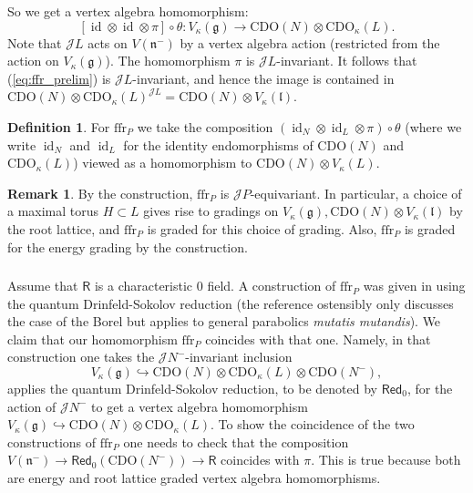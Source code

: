 \documentclass{amsart}
\theoremstyle{definition}
\newtheorem{defi}[Thm]{Definition}
\newtheorem{Rem}[Thm]{Remark}
\newcommand{\sss}{\subsubsection{}}
\newcommand{\Ring}{\mathsf{R}}
\newcommand{\g}{\mathfrak{g}}
\newcommand{\ffr}{\mathrm{ffr}}
\newcommand{\lf}{\mathfrak{l}}
\newcommand{\Jet}{\mathscr{J}}
\newcommand{\CDO}{\mathrm{CDO}}
\numberwithin{equation}{section}
\begin{document}
So we get a vertex algebra homomorphism:
\begin{equation}\label{eq:ffr_prelim}
[\operatorname{id}\otimes \operatorname{id}\otimes \pi]\circ \theta:
V_\kappa(\g)\rightarrow \CDO(N)\otimes \CDO_\kappa(L).
\end{equation}
Note that $\Jet L$ acts on $V(\mathfrak{n}^-)$ by a vertex algebra action (restricted from the action on $V_\kappa(\g)$). The homomorphism $\pi$ is $\Jet L$-invariant. It follows that (\ref{eq:ffr_prelim}) is $\Jet L$-invariant,
and hence the image is contained in 
$\CDO(N)\otimes \CDO_\kappa(L)^{\Jet L}=\CDO(N)\otimes V_\kappa(\lf)$. 

\begin{defi}\label{defi:ffrP}
For $\ffr_P$ we take the composition $(\operatorname{id}_N\otimes \operatorname{id}_L\otimes \pi)\circ \theta$ (where we write $\operatorname{id}_N$ and  
$\operatorname{id}_L$ for the identity endomorphisms of $\CDO(N)$ and $\CDO_\kappa(L)$) viewed as a homomorphism to $\CDO(N)\otimes V_\kappa(L)$. 
\end{defi}

\begin{Rem}\label{Rem:ffr_equivariance}
By the construction,
$\ffr_P$ is $\Jet P$-equivariant. In particular, a choice of a maximal torus $H\subset L$ gives rise to gradings on $V_\kappa(\g),\CDO(N)\otimes V_\kappa(\lf)$ by the root lattice, and $\ffr_P$ is graded for this choice of grading. Also, $\ffr_P$ is graded for the energy grading by the construction.
\end{Rem}

\sss\label{SSS_ffrp_previous}
Assume that $\Ring$ is a characteristic $0$ field. A construction of $\ffr_P$ was given in \cite[Section 10.1-3]{FG} using the quantum Drinfeld-Sokolov reduction (the reference ostensibly only discusses the case of the Borel but applies to general parabolics {\em mutatis mutandis}). We claim that our homomorphism $\ffr_P$ coincides with that one. Namely, in that construction one takes 
the $\Jet N^-$-invariant inclusion 
$$V_\kappa(\g)\hookrightarrow 
\CDO(N)\otimes \CDO_{\kappa}(L)\otimes \CDO(N^-),$$
applies the quantum Drinfeld-Sokolov reduction, to be denoted by $\mathsf{Red}_0$, for the action of $\Jet N^-$ to get 
a vertex algebra homomorphism $V_\kappa(\g)\hookrightarrow 
\CDO(N)\otimes \CDO_{\kappa}(L)$. To show the coincidence of the two constructions of $\ffr_P$ one needs to check that the composition $V(\mathfrak{n}^-) \rightarrow \mathsf{Red}_0(\CDO(N^-))\rightarrow \Ring$ coincides with $\pi$. This is true because both are energy and root lattice graded vertex algebra homomorphisms.  
\end{document}
